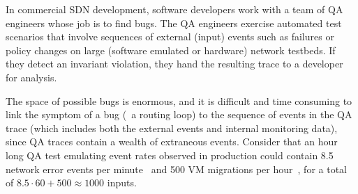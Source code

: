 In commercial SDN development, software developers work with a team of QA engineers whose
job is to find bugs. The QA engineers exercise automated test scenarios that involve
sequences of external (input) events such as failures or policy changes
on large (software emulated or hardware) network testbeds.
If they detect an invariant violation, they hand the resulting trace to a developer for analysis.

The space of possible bugs is enormous, and it is difficult and time
consuming to link the
symptom of a bug (\eg~a routing loop) to the sequence of events in the QA
trace (which includes both the external events and internal monitoring data),
since QA traces contain a wealth
of extraneous events.
Consider that an hour long QA test
emulating event rates observed in production could contain 8.5 network error events per
minute~\cite{Greenberg:2009:VSF:1592568.1592576} and 500 VM migrations per
hour~\cite{Soundararajan:2010:CBS:1899928.1899941},
for a total of $8.5 \cdot 60 + 500 \approx 1000$ inputs.


